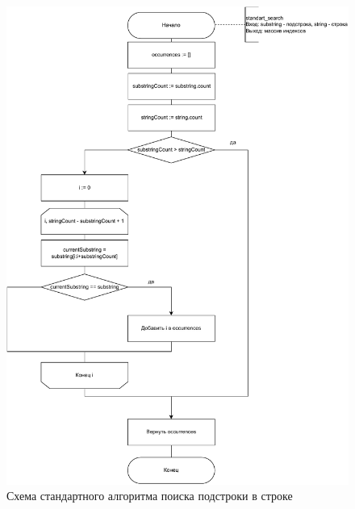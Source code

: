 \begin{figure}[h]
	\centering
	\includegraphics[width=1\linewidth]{img/standart.pdf}
	\caption{Схема стандартного алгоритма поиска подстроки в строке}
	\label{img:standart}
\end{figure}

